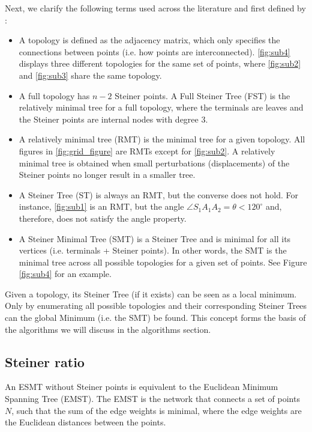 \documentclass{l4proj}
\begin{document}
Next, we clarify the following terms used across the literature and first defined by \cite{Gilbert1968SteinerMT}:
\begin{itemize}
    \item A topology is defined as the adjacency matrix, which only specifies the connections between points (i.e. how points are interconnected). \ref{fig:sub4} displays three different topologies for the same set of points, where \ref{fig:sub2} and \ref{fig:sub3} share the same topology.
    \item \label{prop:fst_definition} A full topology has $n - 2$ Steiner points. A Full Steiner Tree (FST) is the relatively minimal tree for a full topology, where the terminals are leaves and the Steiner points are internal nodes with degree 3.
    \item A relatively minimal tree (RMT) is the minimal tree for a given topology. All figures in \ref{fig:grid_figure} are RMTs except for \ref{fig:sub2}. A relatively minimal tree is obtained when small perturbations (displacements) of the Steiner points no longer result in a smaller tree.
    \item  A Steiner Tree (ST) is always an RMT, but the converse does not hold. For instance, \ref{fig:sub1} is an RMT, but the angle $\angle S_1A_1A_2 = \theta < 120^\circ$ and, therefore, does not satisfy the angle property.
    \item A Steiner Minimal Tree (SMT) is a Steiner Tree and is minimal for all its vertices (i.e. terminals + Steiner points). In other words, the SMT is the minimal tree across all possible topologies for a given set of points. See Figure \ref{fig:sub4} for an example.
\end{itemize}

Given a topology, its Steiner Tree (if it exists) can be seen as a local minimum. Only by enumerating all possible topologies and their corresponding Steiner Trees can the global Minimum (i.e. the SMT) be found. This concept forms the basis of the algorithms we will discuss in the algorithms section.

\subsection{Steiner ratio}
\label{sec:esmt_steiner_ratio}
An ESMT without Steiner points is equivalent to the Euclidean  Minimum Spanning Tree (EMST). The EMST is the network that connects a set of points $N$, such that the sum of the edge weights is minimal, where the edge weights are the Euclidean distances between the points.
\end{document}

